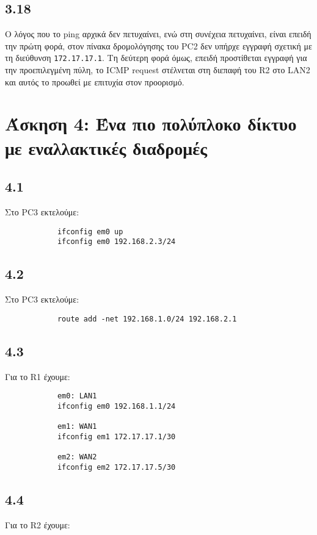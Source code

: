 \documentclass[a4paper, 12pt]{article}
\begin{document}
	\subsection*{3.18}
		Ο λόγος που το ping αρχικά δεν πετυχαίνει, ενώ στη συνέχεια πετυχαίνει, είναι επειδή την πρώτη φορά, στον πίνακα δρομολόγησης του PC2 δεν υπήρχε εγγραφή σχετική με τη διεύθυνση \verb|172.17.17.1|. Τη δεύτερη φορά όμως, επειδή προστίθεται εγγραφή για την προεπιλεγμένη πύλη, το ICMP request στέλνεται στη διεπαφή του R2 στο LAN2 και αυτός το προωθεί με επιτυχία στον προορισμό. 

\section*{Άσκηση 4: Ένα πιο πολύπλοκο δίκτυο με εναλλακτικές διαδρομές}

	\subsection*{4.1}
		Στο PC3 εκτελούμε:
		
		\begin{verbatim}
			ifconfig em0 up
			ifconfig em0 192.168.2.3/24
		\end{verbatim}

	\subsection*{4.2}
		Στο PC3 εκτελούμε:
		
		\begin{verbatim}
			route add -net 192.168.1.0/24 192.168.2.1
		\end{verbatim}

	\subsection*{4.3}
		Για το R1 έχουμε:
		
		\begin{verbatim}
			em0: LAN1
			ifconfig em0 192.168.1.1/24
			
			em1: WAN1
			ifconfig em1 172.17.17.1/30
			
			em2: WAN2
			ifconfig em2 172.17.17.5/30
		\end{verbatim}

	\subsection*{4.4}
		Για το R2 έχουμε:
		
\end{document}
